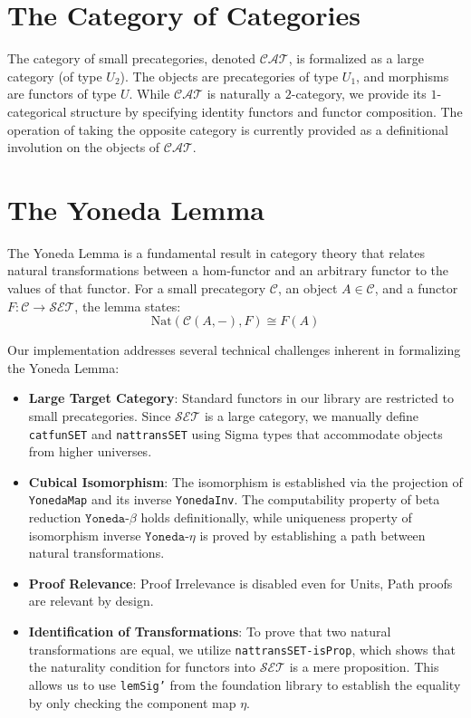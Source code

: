 \documentclass[11pt]{article}
\newcommand{\catC}{\mathcal{C}}
\begin{document}
\section{The Category of Categories}

The category of small precategories, denoted $\mathcal{CAT}$, is formalized as a large category (of type $U_2$). The objects are precategories of type $U_1$, and morphisms are functors of type $U$. While $\mathcal{CAT}$ is naturally a $2$-category, we provide its $1$-categorical structure by specifying identity functors and functor composition. The operation of taking the opposite category is currently provided as a definitional involution on the objects of $\mathcal{CAT}$.

\section{The Yoneda Lemma}

The Yoneda Lemma is a fundamental result in category theory that relates natural transformations between a hom-functor and an arbitrary functor to the values of that functor. For a small precategory $\catC$, an object $A \in \catC$, and a functor $F : \catC \to \mathcal{SET}$, the lemma states:
\begin{equation}
    \text{Nat}(\catC(A, -), F) \cong F(A)
\end{equation}

Our implementation addresses several technical challenges inherent in formalizing the Yoneda Lemma:
\begin{itemize}
    \item \textbf{Large Target Category}: Standard functors in our library are restricted to small precategories. Since $\mathcal{SET}$ is a large category, we manually define \texttt{catfunSET} and \texttt{nattransSET} using Sigma types that accommodate objects from higher universes.
    \item \textbf{Cubical Isomorphism}: The isomorphism is established via the projection of \texttt{YonedaMap} and its inverse \texttt{YonedaInv}. The computability property of beta reduction $\texttt{Yoneda-$\beta$}$ holds definitionally, while uniqueness property of isomorphism inverse $\texttt{Yoneda-$\eta$}$ is proved by establishing a path between natural transformations.
    \item \textbf{Proof Relevance}: Proof Irrelevance is disabled even for Units, Path proofs are relevant by design.
    \item \textbf{Identification of Transformations}: To prove that two natural transformations are equal, we utilize \texttt{nattransSET-isProp}, which shows that the naturality condition for functors into $\mathcal{SET}$ is a mere proposition. This allows us to use \texttt{lemSig'} from the foundation library to establish the equality by only checking the component map $\eta$.
\end{itemize}
\end{document}
